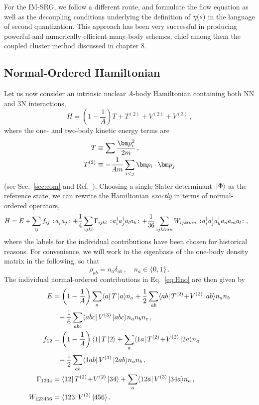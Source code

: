 For the IM-SRG, we follow a different route, and formulate the flow equation as well as the decoupling conditions underlying the definition of $\eta(s)$ in the language of second quantization. This approach has been very successful in producing powerful and numerically efficient many-body schemes, chief among them the coupled cluster method discussed in chapter 8.

\subsection{Normal-Ordered Hamiltonian}
Let us now consider an intrinsic nuclear $A$-body Hamiltonian containing both NN and 3N interactions,
\begin{equation}\label{eq:def_Hint}
  H = \left(1-\frac{1}{A}\right)T + T^{(2)} + V^{(2)} +V^{(3)}\,,
\end{equation}
where the one- and two-body kinetic energy terms are
\begin{align}
  T &\equiv \sum\frac{\pOV^2_i}{2m}\,,\\
  T^{(2)} &\equiv -\frac{1}{Am}\sum_{i<j}\pOV_i\cdot\pOV_j
\end{align}
(see Sec.~\ref{sec:com} and Ref.~\cite{Hergert:2009wh}). Choosing a single Slater determinant $\,|{\Phi}\rangle$ as the reference state, we can rewrite the Hamiltonian \emph{exactly} in terms of normal-ordered operators,
\begin{align}\label{eq:Hno}
  \HO &= E + \sum_{ij}f_{ij}\nord{\aaO_{i}\aO_{j}} + \frac{1}{4}\sum_{ijkl}\Gamma_{ijkl}\nord{\aaO_{i}\aaO_{j}\aO_{l}\aO_{k}}
    + \frac{1}{36}\sum_{ijklmn}W_{ijklmn}\nord{\aaO_{i}\aaO_{j}\aaO_{k}\aO_{n}\aO_{m}\aO_{l}}\,,
\end{align}
where the labels for the individual contributions have been chosen for historical reasons. For convenience, we will work in the eigenbasis of the one-body density matrix in the following, so that
\begin{equation}\label{eq:def_natorb}
  \rho_{ab}=n_{a}\delta_{ab}\,,\quad n_{a}\in\{0,1\}\,.
\end{equation}
The individual normal-ordered contributions in Eq.~\eqref{eq:Hno} are then given by
\begin{align}
  E &= \left(1-\frac{1}{A}\right)\sum_{a}\matrixe{a}{T}{a}n_{a}
  		+ \frac{1}{2}\sum_{ab}\matrixe{ab}{T^{(2)}\!+\!V^{(2)}}{ab}n_{a}n_{b}\notag\\
  		&\hphantom{=}+ \frac{1}{6}\sum_{abc}\matrixe{abc}{V^{(3)}}{abc}n_{a}n_{b}n_{c}\,,\label{eq:E0}\\
%
  f_{12} &= \left(1-\frac{1}{A}\right)\matrixe{1}{T}{2} 
  		+ \sum_{a}\matrixe{1a}{T^{(2)}\!+\!V^{(2)}}{2a}n_{a}\notag\\
  		&\hphantom{=}+ \frac{1}{2}\sum_{ab}\matrixe{1ab}{V^{(3)}}{2ab}n_{a}n_{b}\,,\label{eq:f}		\\
  \Gamma_{1234} &= \matrixe{12}{T^{(2)}\!+\!V^{(2)}}{34} + \sum_{a}\matrixe{12a}{V^{(3)}}{34a}n_{a}\,,\label{eq:Gamma}\\
  W_{123456}&=\matrixe{123}{V^{(3)}}{456}\,.
\end{align}
